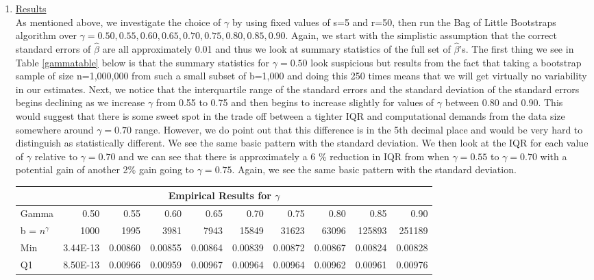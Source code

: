 \documentclass[a4paper, 11pt]{report}
\begin{document}
\begin{enumerate}
	    \item \Large\underline{Results}\normalsize \\
	    
		    As mentioned above, we investigate the choice of $\gamma$ by using fixed values of s=5 and r=50, then run the Bag of Little Bootstraps algorithm over $\gamma = 0.50, 0.55, 0.60, 0.65, 0.70, 0.75, 0.80, 0.85, 0.90$.	 Again, we start with the simplistic assumption that the correct standard errors of $\widehat{\beta}$ are all approximately 0.01 and thus we look at summary statistics of the full set of $\widehat{\beta}$'s.  The first thing we see in Table \ref{gammatable} below is that the summary statistics for $\gamma = 0.50$ look suspicious but results from the fact that taking a bootstrap sample of size n=1,000,000 from such a small subset of b=1,000 and doing this 250 times means that we will get virtually no variability in our estimates.  Next, we notice that the interquartile range of the standard errors and the standard deviation of the standard errors begins declining as we increase $\gamma$ from 0.55 to 0.75 and then begins to increase slightly for values of $\gamma$ between 0.80 and 0.90.  This would suggest that there is some sweet spot in the trade off between a tighter IQR and computational demands from the data size somewhere around $\gamma=0.70$ range. However, we do point out that this difference is in the 5th decimal place and would be very hard to distinguish as statistically different.  We see the same basic pattern with the standard deviation.  We then look at the IQR for each value of $\gamma$ relative to $\gamma=0.70$ and we can see that there is approximately a 6 \% reduction in IQR from when $\gamma=0.55$ to $\gamma=0.70$ with a potential gain of another 2\% gain going to $\gamma=0.75$.  Again, we see the same basic pattern with the standard deviation.  
			\begin{table}[H]
				\centering \footnotesize
				\begin{tabular}{lrrrrrrrrr} 
				  \hline
				  \multicolumn{10}{c}{Empirical Results for $\gamma$} \\
				  \hline
				  Gamma & 0.50 & 0.55 & 0.60 & 0.65 & 0.70 & 0.75 & 0.80 & 0.85 & 0.90 \\ 			
				  b = $n^\gamma$ & 1000 & 1995 & 3981 & 7943 & 15849 & 31623 & 63096 & 125893 & 251189 \\ 
				  \hline
				  Min & 3.44E-13 & 0.00860 & 0.00855 & 0.00864 & 0.00839 & 0.00872 & 0.00867 & 0.00824 & 0.00828 \\ 
				  Q1 & 8.50E-13 & 0.00966 & 0.00959 & 0.00967 & 0.00964 & 0.00964 & 0.00962 & 0.00961 & 0.00976 \\ 

\end{tabular}
\end{table}
\end{enumerate}
\end{document}
